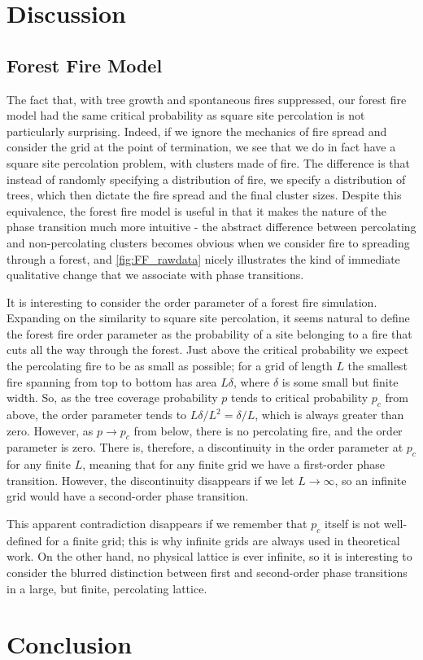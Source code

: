\documentclass[%
 reprint,
 amsmath,amssymb,
 aps,
]{revtex4-2}
\begin{document}

\section{Discussion}
\subsection{Forest Fire Model}
The fact that, with tree growth and spontaneous fires suppressed, our forest fire model had the same critical probability as square site percolation is not particularly surprising. Indeed, if we ignore the mechanics of fire spread and consider the grid at the point of termination, we see that we do in fact have a square site percolation problem, with clusters made of fire. The difference is that instead of randomly specifying a distribution of fire, we specify a distribution of trees, which then dictate the fire spread and the final cluster sizes. Despite this equivalence, the forest fire model is useful in that it makes the nature of the phase transition much more intuitive - the abstract difference between percolating and non-percolating clusters becomes obvious when we consider fire to spreading through a forest, and \cref{fig:FF_rawdata} nicely illustrates the kind of immediate qualitative change that we associate with phase transitions. 

It is interesting to consider the order parameter of a forest fire simulation. Expanding on the similarity to square site percolation, it seems natural to define the forest fire order parameter as the probability of a site belonging to a fire that cuts all the way through the forest. Just above the critical probability we expect the percolating fire to be as small as possible; for a grid of length $L$ the smallest fire spanning from top to bottom has area $L\delta$, where $\delta$ is some small but finite width. So, as the tree coverage probability $p$ tends to critical probability $p_c$ from above, the order parameter tends to $L\delta/L^2 = \delta/L$, which is always greater than zero. However, as $p\to p_c$ from below, there is no percolating fire, and the order parameter is zero. There is, therefore, a discontinuity in the order parameter at $p_c$ for any finite $L$, meaning that for any finite grid we have a first-order phase transition. However, the discontinuity disappears if we let $L\to\infty$, so an infinite grid would have a second-order phase transition. 

This apparent contradiction disappears if we remember that $p_c$ itself is not well-defined for a finite grid; this is why infinite grids are always used in theoretical work. On the other hand, no physical lattice is ever infinite, so it is interesting to consider the blurred distinction between first and second-order phase transitions in a large, but finite, percolating lattice.

\section{Conclusion}
\newpage
\end{document}

